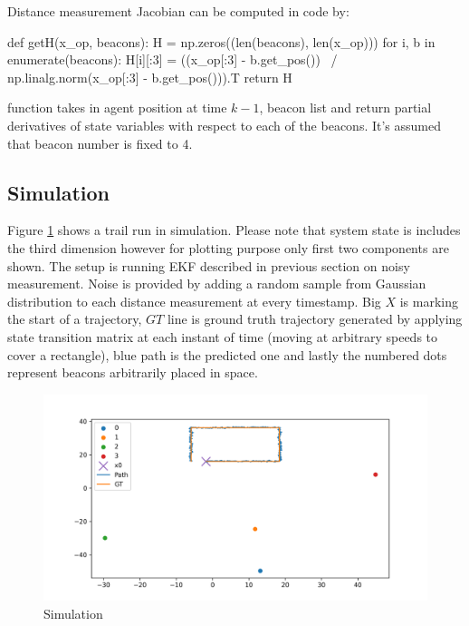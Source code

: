 Distance measurement Jacobian can be computed in code by:

\begin{minipage}{\linewidth}
    \begin{python}
    def getH(x_op, beacons):
        H = np.zeros((len(beacons), len(x_op)))
        for i, b in enumerate(beacons):
        H[i][:3] = ((x_op[:3] - b.get_pos()) \
            / np.linalg.norm(x_op[:3] - b.get_pos())).T
        return H
    \end{python}
\end{minipage}
function takes in agent position at time $k-1$, beacon list and return partial derivatives of state variables with respect to each of the beacons. It's assumed that beacon number is fixed to 4.

\subsection{Simulation}

Figure \ref{fig:sim} shows a trail run in simulation. Please note that system state is includes the third dimension however for plotting purpose only first two components are shown. The setup is running EKF described in previous section on noisy measurement. Noise is provided by adding a random sample from Gaussian distribution to each distance measurement at every timestamp. Big $X$ is marking the start of a trajectory, $GT$ line is ground truth trajectory generated by applying state transition matrix at each instant of time (moving at arbitrary speeds to cover a rectangle), blue path is the predicted one and lastly the numbered dots represent beacons arbitrarily placed in space.
\begin{figure}[H]
    \includegraphics[width=\linewidth]{figures/sim.png}
    \caption{Simulation}
    \label{fig:sim}
\end{figure}